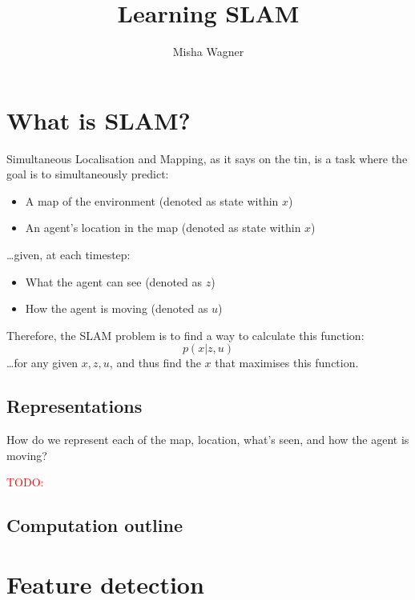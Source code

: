 \documentclass{article}
\title{Learning SLAM}
\author{Misha Wagner}
\makeatletter
\newcommand{\todo}[1]{\textcolor{red}{TODO:\@ #1}}
\makeatother
\begin{document}
\maketitle
\tableofcontents
\newpage


\section{What is SLAM?}

Simultaneous Localisation and Mapping, as it says on the tin, is a task where
the goal is to simultaneously predict:
\begin{itemize}
  \item A map of the environment (denoted as state within $x$)
  \item An agent's location in the map (denoted as state within $x$)
\end{itemize}
\dots given, at each timestep:
\begin{itemize}
  \item What the agent can see (denoted as $z$)
  \item How the agent is moving (denoted as $u$)
\end{itemize}

Therefore, the SLAM problem is to find a way to calculate this function:
\begin{equation}\label{slam}
  p(x \vert z, u)
\end{equation}
\dots for any given $x, z, u$, and thus find the $x$ that maximises this
function.

\subsection{Representations}

How do we represent each of the map, location, what's seen, and how the agent
is moving?

\todo{}

\subsection{Computation outline}

\section{Feature detection}
\end{document}
